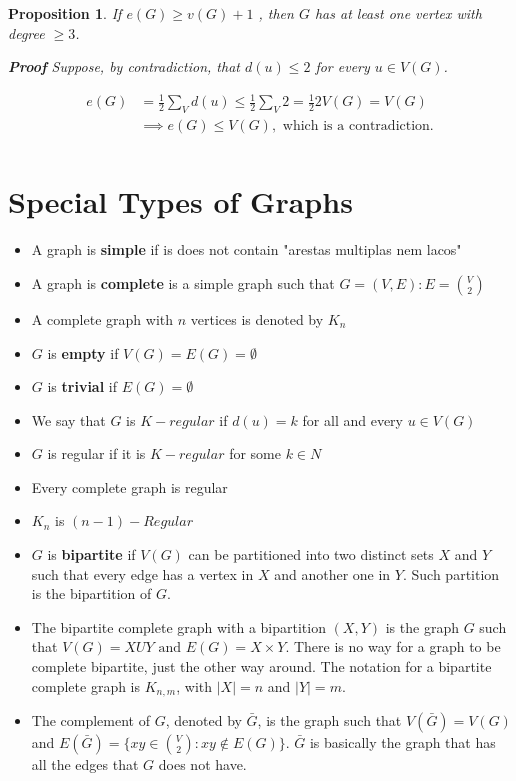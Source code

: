 \documentclass{article}
\newtheorem{proposition}{Proposition}
\begin{document}
\begin{proposition}
	If  $e(G) \geq  v(G) +  1$ , then $G$ has at least one vertex with degree $\geq 3$.
	
	\textbf{Proof}
	Suppose, by contradiction, that $d(u) \leq 2$ for every $u \in V(G)$.
	
	\begin{align}
		e(G) &= \frac{1}{2} \sum_V d(u) \leq \frac{1}{2} \sum_V 2 = \frac{1}{2} 2V(G) = V(G) \\
		&\implies e(G) \leq V(G), \text{   which is a contradiction.} \\
	\end{align}
\end{proposition}


\section{Special Types of Graphs}

\begin{itemize}
	\item A graph is \textbf{simple} if is does not contain "arestas multiplas nem lacos"
	\item A graph is \textbf{complete} is a simple graph such that $G=(V,E) : E = \binom{V}{2}$
	\item A complete graph with $n$ vertices is denoted by $K_n$
	\item $G$ is \textbf{empty} if $V(G) = E(G) = \emptyset$
	\item $G$ is \textbf{trivial} if $E(G) = \emptyset$
	\item We say that $G$ is \textbf{$K-regular$} if $d(u) = k$ for all and every $u \in V(G)$
	\item $G$ is regular if it is $K-regular$ for some $k \in N$
	\item Every complete graph is regular
	\item $K_n$ is $(n-1)-Regular$
	\item $G$ is \textbf{bipartite} if $V(G)$ can be partitioned into two distinct sets $X$ and $Y$ such that every edge has a vertex in $X$ and another one in $Y$. Such partition is the bipartition of $G$. 
	\item The bipartite complete graph with a bipartition $(X,Y)$ is the graph $G$ such that $V(G) = X U Y \text{  and  } E(G) = X \times Y$. There is no way for a graph to be complete bipartite, just the other way around. The notation for a bipartite complete graph is $K_{n,m}$, with $|X| = n$ and $|Y| = m$.
	\item The complement of $G$, denoted by $\bar{G}$, is the graph such that $V(\bar{G}) = V(G)$ and $E(\bar{G}) = \{  xy \in \binom{V}{2} : xy \notin E(G)\}$. $\bar{G}$ is basically the graph that has all the edges that $G$ does not have. 
\end{itemize}
\end{document}

